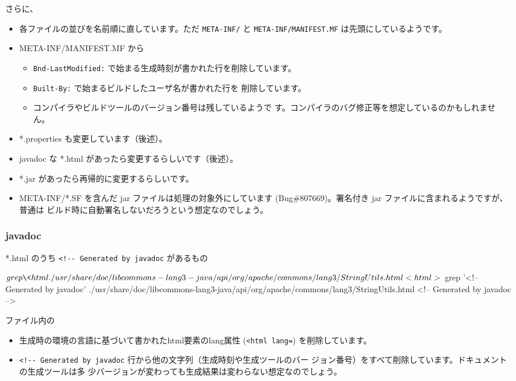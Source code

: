\documentclass[mingoth,a4paper]{jsarticle}
\begin{document}
さらに、
\begin{itemize}
 \item 各ファイルの並びを名前順に直しています。ただ \verb|META-INF/| と
       \verb|META-INF/MANIFEST.MF| は先頭にしているようです。
 \item META-INF/MANIFEST.MF から
       \begin{itemize}
	\item \verb|Bnd-LastModified:| で始まる生成時刻が書かれた行を削除しています。
	\item \verb|Built-By:| で始まるビルドしたユーザ名が書かれた行を
	      削除しています。
	\item コンパイラやビルドツールのバージョン番号は残しているようで
	      す。コンパイラのバグ修正等を想定しているのかもしれません。
       \end{itemize}
 \item *.properties も変更しています（後述）。
 \item javadoc な *.html があったら変更するらしいです（後述）。
 \item *.jar があったら再帰的に変更するらしいです。
 \item META-INF/*.SF を含んだ jar ファイルは処理の対象外にしています
       (Bug\#807669)。署名付き jar ファイルに含まれるようですが、普通は
       ビルド時に自動署名しないだろうという想定なのでしょう。
\end{itemize}

\subsubsection{javadoc}
*.html のうち \verb|<!-- Generated by javadoc| があるもの

\begin{commandline}
$ grep \<html ./usr/share/doc/libcommons-lang3-java/api/org/apache/commons/lang3/StringUtils.html
<html>
$ grep '<!-- Generated by javadoc' ./usr/share/doc/libcommons-lang3-java/api/org/apache/commons/lang3/StringUtils.html
<!-- Generated by javadoc -->
\end{commandline}

ファイル内の
\begin{itemize}
 \item 生成時の環境の言語に基づいて書かれたhtml要素のlang属性
       (\verb|<html lang=|) を削除しています。
 \item \verb|<!-- Generated by javadoc| 行から他の文字列（生成時刻や生成ツールのバー
       ジョン番号）をすべて削除しています。ドキュメントの生成ツールは多
       少バージョンが変わっても生成結果は変わらない想定なのでしょう。
\end{itemize}
\end{document}
